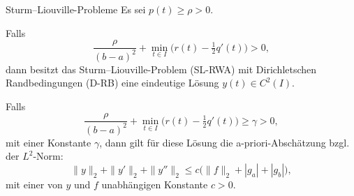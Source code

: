 \begin{satz}{Sturm--Liouville-Probleme}
    Es sei $p(t)\ge\rho>0$.

    \medskip

    Falls
    $$
    \frac{\rho}{(b-a)^2}+\min_{t\in I}\!\Big(r(t)-\tfrac{1}{2}q'(t)\Big)>0,
    $$
    dann besitzt das Sturm--Liouville-Problem (SL-RWA) mit Dirichletschen Randbedingungen (D-RB) eine eindeutige Lösung $y(t)\in C^2(I)$.

    \medskip

    Falls
    $$
    \frac{\rho}{(b-a)^2}+\min_{t\in I}\!\Big(r(t)-\tfrac{1}{2}q'(t)\Big)\ge\gamma>0,
    $$
    mit einer Konstante $\gamma$, dann gilt für diese Lösung die a-priori-Abschätzung bzgl. der $L^2$-Norm:
    $$
    \|y\|_2+\|y'\|_2+\|y''\|_2 \le c\big(\|f\|_2 + |g_a| + |g_b|\big),
    $$
    mit einer von $y$ und $f$ unabhängigen Konstante $c>0$.    
\end{satz}